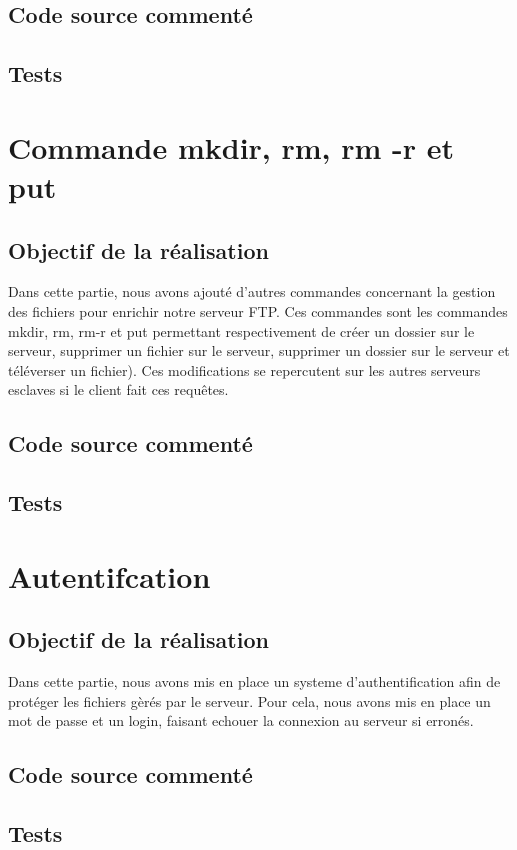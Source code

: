 \documentclass{report}
\begin{document}
      \section{Code source comment\'e}
      \section{Tests}

    \chapter{Commande mkdir, rm, rm -r et put}
      \section{Objectif de la r\'ealisation}
	Dans cette partie, nous avons ajout\'e d'autres commandes concernant la gestion des fichiers pour enrichir notre serveur FTP. Ces commandes sont les commandes mkdir, rm, rm-r et put permettant respectivement de cr\'eer un dossier sur le serveur, supprimer un fichier sur le serveur, supprimer un dossier sur le serveur et t\'el\'everser un fichier). Ces modifications se repercutent sur les autres serveurs esclaves si le client fait ces requ\^etes.
      \section{Code source comment\'e}
      \section{Tests}

    \chapter{Autentifcation}
      \section{Objectif de la r\'ealisation}
	Dans cette partie, nous avons mis en place un systeme d'authentification afin de prot\'eger les fichiers g\`er\'es par le serveur. Pour cela, nous avons mis en place un mot de passe et un login, faisant echouer la connexion au serveur si erron\'es.
      \section{Code source comment\'e}
      \section{Tests}
\end{document}
